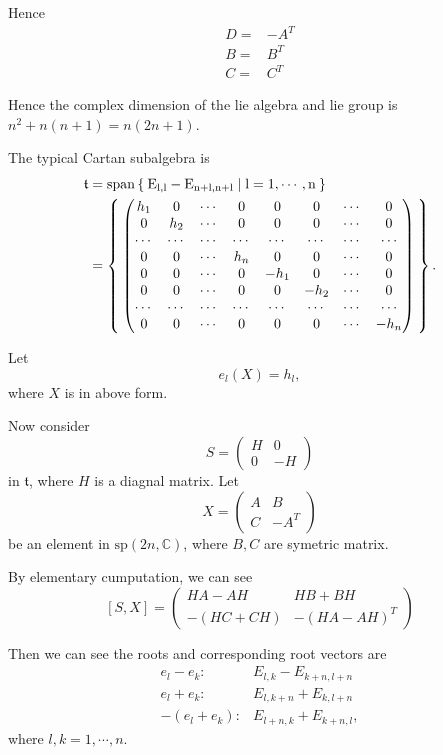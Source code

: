 \documentclass[12pt]{amsart}
\def\bC{{\mathbb{C}}}
\def\sspan{\rm{span}}
\def\asp{\mathrm{sp}}
\def\ft{\mathfrak{t}}
\begin{document}
Hence 
\begin{align*}
D =& -A^T\\
B =& B^T \\
C =&  C^T  
\end{align*}

Hence the complex dimension of the lie algebra and lie group is 
$n^2+n(n+1) = n(2n+1)$.

The typical Cartan subalgebra is 
\[
\begin{split}
\ft &=\sspan\Set{E_{l,l}-E_{n+l,n+l}|l=1,\cdots, n} \\
&= 
\Set{\begin{pmatrix}
    h_1   &   0   & \cdots&  0   & 0    &   0  &\cdots& 0 \\
    0     &   h_2 & \cdots&  0   & 0    &   0  &\cdots& 0  \\
    \cdots& \cdots& \cdots&\cdots&\cdots&\cdots&\cdots& \cdots \\
    0     &   0   & \cdots&  h_n & 0    &   0  &\cdots& 0 \\
    0     &   0   & \cdots&  0   & -h_1 &   0  &\cdots& 0 \\
    0     &   0   & \cdots&  0   &   0  &-h_2  &\cdots& 0 \\
    \cdots& \cdots& \cdots&\cdots&\cdots&\cdots&\cdots& \cdots \\
    0     &   0   &\cdots &  0   &    0 &   0  &\cdots& -h_n     
  \end{pmatrix}}.
\end{split}
\]

Let 
\[
e_l(X) = h_l,
\]
where $X$ is in above form.

Now consider 
\[ S = 
 \begin{pmatrix}
  H & 0 \\
  0 & -H
\end{pmatrix}
\]
in $\ft$, where $H$ is a diagnal matrix.
Let 
\[
X = \begin{pmatrix}
  A & B \\
  C & -A^T
\end{pmatrix}
\] be an element in $\asp(2n,\bC)$, where $B, C$ are symetric matrix. 

By elementary cumputation, we can see
\[
[S, X] = 
\begin{pmatrix}
  HA-AH & HB + BH \\
  -(HC+CH) & -(HA-AH)^T 
\end{pmatrix}
\]

Then we can see the roots and corresponding root vectors are
\begin{align*}
e_l-e_k : & E_{l,k} -E_{k+n,l+n} \\
e_l+e_k : & E_{l, k+n} + E_{k,l+n} \\
-(e_l+e_k) :& E_{l+n,k} + E_{k+n,l} ,
\end{align*}
where $l,k = 1, \cdots, n$.
\end{document}
